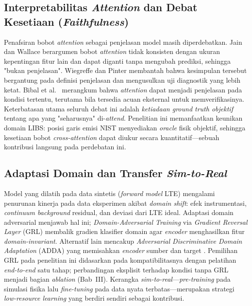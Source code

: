 \subsection{Interpretabilitas \textit{Attention} dan Debat Kesetiaan (\textit{Faithfulness})}
Penafsiran bobot \textit{attention} sebagai penjelasan model masih diperdebatkan. Jain dan Wallace \citep{jain_attention_2019} berargumen bobot \textit{attention} tidak konsisten dengan ukuran kepentingan fitur lain dan dapat diganti tanpa mengubah prediksi, sehingga "bukan penjelasan". Wiegreffe dan Pinter \citep{wiegreffe_attention_2019} membantah bahwa kesimpulan tersebut bergantung pada definisi penjelasan dan mengusulkan uji diagnostik yang lebih ketat. Bibal et al.\ \citep{bibal_attention_2022} merangkum bahwa \textit{attention} dapat menjadi penjelasan pada kondisi tertentu, terutama bila tersedia acuan eksternal untuk memverifikasinya. Keterbatasan utama seluruh debat ini adalah \emph{ketiadaan \textit{ground truth} objektif} tentang apa yang "seharusnya" di-\textit{attend}. Penelitian ini memanfaatkan keunikan domain LIBS: posisi garis emisi NIST menyediakan \textit{oracle} fisik objektif, sehingga kesetiaan bobot \textit{cross-attention} dapat diukur secara kuantitatif---sebuah kontribusi langsung pada perdebatan ini.

\subsection{Adaptasi Domain dan Transfer \textit{Sim-to-Real}}
Model yang dilatih pada data sintetis (\textit{forward model} LTE) mengalami penurunan kinerja pada data eksperimen akibat \textit{domain shift}: efek instrumentasi, \textit{continuum background} residual, dan deviasi dari LTE ideal. Adaptasi domain adversarial menjawab hal ini; \textit{Domain-Adversarial Training} via \textit{Gradient Reversal Layer} (GRL) \citep{ganin_domain_2016} membalik gradien klasifier domain agar \textit{encoder} menghasilkan fitur \textit{domain-invariant}. Alternatif lain mencakup \textit{Adversarial Discriminative Domain Adaptation} (ADDA) yang memisahkan \textit{encoder} sumber dan target \citep{tzeng_adversarial_2017}. Pemilihan GRL pada penelitian ini didasarkan pada kompatibilitasnya dengan pelatihan \textit{end-to-end} satu tahap; perbandingan eksplisit terhadap kondisi tanpa GRL menjadi bagian \textit{ablation} (Bab~III). Kerangka \textit{sim-to-real}---\textit{pre-training} pada simulasi fisika lalu \textit{fine-tuning} pada data nyata terbatas---merupakan strategi \textit{low-resource learning} yang berdiri sendiri sebagai kontribusi.

